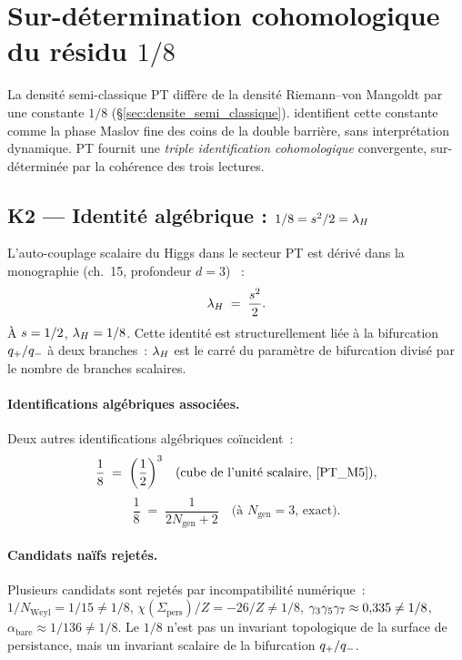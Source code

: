 \section{Sur-détermination cohomologique du résidu $1/8$}
\label{sec:surdetermination_un_huitieme}

La densité semi-classique PT diffère de la densité Riemann--von Mangoldt
par une constante $1/8$ (\S\ref{sec:densite_semi_classique}).
\citeauthor{BerryKeating1999} \citeyear{BerryKeating1999} identifient
cette constante comme la phase Maslov fine des coins de la double
barrière, sans interprétation dynamique. PT fournit une \emph{triple
identification cohomologique} convergente, sur-déterminée par la
cohérence des trois lectures.

\subsection{K2 — Identité algébrique : $1/8 = s^{2}/2 = \lambda_H$}
\label{sec:K2}

L'auto-couplage scalaire du Higgs dans le secteur PT est dérivé dans la
monographie (ch.~15, profondeur $d = 3$) \cite{PT_Foundations}~:
\begin{equation}
\lambda_H \;=\; \dfrac{s^{2}}{2}.
\label{eq:lambdaH}
\end{equation}
À $s = 1/2$, $\lambda_H = 1/8$. Cette identité est structurellement
liée à la bifurcation $q_{+}/q_{-}$ à deux branches~: $\lambda_H$ est
le carré du paramètre de bifurcation divisé par le nombre de branches
scalaires.

\paragraph{Identifications algébriques associées.}
Deux autres identifications algébriques coïncident~:
\[
\dfrac{1}{8} \;=\; \bigg(\dfrac{1}{2}\bigg)^{3}
\quad \text{(cube de l'unit\'e scalaire, \cite{PT_M5})},
\]
\[
\dfrac{1}{8} \;=\; \dfrac{1}{2 N_{\mathrm{gen}} + 2}
\quad \text{(\`a $N_{\mathrm{gen}} = 3$, exact)}.
\]

\paragraph{Candidats naïfs rejetés.}
Plusieurs candidats sont rejetés par incompatibilité numérique~:
$1/N_{\mathrm{Weyl}} = 1/15 \ne 1/8$,
$\chi(\Sigma_{\mathrm{pers}})/Z = -26/Z \ne 1/8$,
$\gamma_{3} \gamma_{5} \gamma_{7} \approx 0{,}335 \ne 1/8$,
$\alpha_{\mathrm{bare}} \approx 1/136 \ne 1/8$. Le $1/8$ n'est pas un
invariant topologique de la surface de persistance, mais un invariant
scalaire de la bifurcation $q_{+}/q_{-}$.

